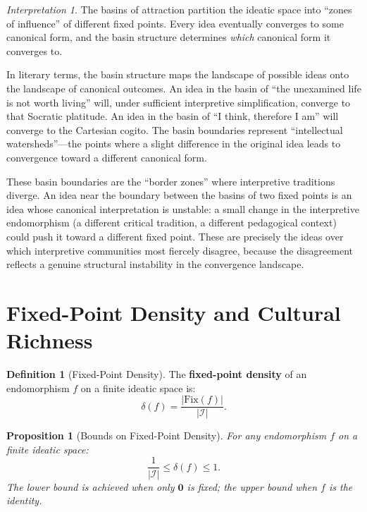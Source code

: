 \documentclass[11pt,openany]{book}
\theoremstyle{definition}
\newtheorem{definition}[axiom]{Definition}
\theoremstyle{plain}
\newtheorem{proposition}[axiom]{Proposition}
\theoremstyle{remark}
\newtheorem{interpretation}[axiom]{Interpretation}
\newcommand{\IS}{\mathcal{I}}               %
\newcommand{\void}{\mathbf{0}}              %
\begin{document}
\begin{interpretation}
The basins of attraction partition the ideatic space into ``zones of influence'' of different fixed points. Every idea eventually converges to some canonical form, and the basin structure determines \emph{which} canonical form it converges to.

In literary terms, the basin structure maps the landscape of possible ideas onto the landscape of canonical outcomes. An idea in the basin of ``the unexamined life is not worth living'' will, under sufficient interpretive simplification, converge to that Socratic platitude. An idea in the basin of ``I think, therefore I am'' will converge to the Cartesian cogito. The basin boundaries represent ``intellectual watersheds''---the points where a slight difference in the original idea leads to convergence toward a different canonical form.

These basin boundaries are the ``border zones'' where interpretive traditions diverge. An idea near the boundary between the basins of two fixed points is an idea whose canonical interpretation is unstable: a small change in the interpretive endomorphism (a different critical tradition, a different pedagogical context) could push it toward a different fixed point. These are precisely the ideas over which interpretive communities most fiercely disagree, because the disagreement reflects a genuine structural instability in the convergence landscape.
\end{interpretation}

\section{Fixed-Point Density and Cultural Richness}

\begin{definition}[Fixed-Point Density]
The \textbf{fixed-point density} of an endomorphism $f$ on a finite ideatic space is:
\[
\delta(f) = \frac{|\mathrm{Fix}(f)|}{|\IS|}.
\]
\end{definition}

\begin{proposition}[Bounds on Fixed-Point Density]
For any endomorphism $f$ on a finite ideatic space:
\[
\frac{1}{|\IS|} \leq \delta(f) \leq 1.
\]
The lower bound is achieved when only $\void$ is fixed; the upper bound when $f$ is the identity.
\end{proposition}
\end{document}
